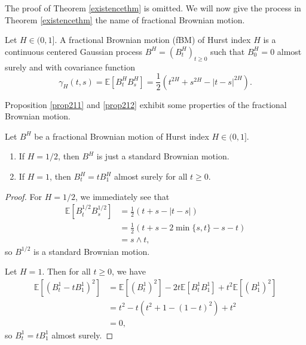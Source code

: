 The proof of Theorem \ref{existencethm} is omitted. 
We will now give the process in Theorem \ref{existencethm} the name of fractional Brownian motion.%
\begin{defn}
    Let $H\in (0,1]$. A fractional Brownian motion (fBM) of Hurst index $H$ is a continuous centered Gaussian process $B^{H}=(B_{t}^{H})_{t\geq 0}$ such that $B_{0}^{H}=0$ almost surely and with covariance function
    \begin{equation}
        \gamma_{H}(t,s)=\mathbb{E}[B_{t}^{H}B_{s}^{H}]=\frac{1}{2}\left(t^{2H}+s^{2H}-|t-s|^{2H}\right).
    \end{equation}
\end{defn}
Proposition \ref{prop211} and \ref{prop212} exhibit some properties of the fractional Brownian motion.
\begin{prop}\label{prop211}
    Let $B^{H}$ be a fractional Brownian motion of Hurst index $H\in (0,1]$.
    \begin{enumerate}
        \item If $H=1/2$, then $B^{H}$ is just a standard Brownian motion.
        \item If $H=1$, then $B^{H}_{t}=tB_{1}^{H}$ almost surely for all $t\geq 0$.
    \end{enumerate}
\end{prop}
\begin{proof}
    For $H=1/2$, we immediately see that
    \begin{align}
        \mathbb{E}[B_{t}^{1/2}B_{s}^{1/2}]&=\frac{1}{2}\left(t+s-|t-s|\right)\\
        &= \frac{1}{2}\left(t+s-2 \min\{s,t\}-s-t\right)\\
        &= s\land t,
    \end{align}
    so $B^{1/2}$ is a standard Brownian motion.

    Let $H=1$. Then for all $t\geq 0$, we have
    \begin{align}
        \mathbb{E}\left[(B^{1}_{t}-tB_{1}^{1})^{2}\right]&= \mathbb{E}\left[(B_{t}^{1})^{2}\right]-2t\mathbb{E}\left[B_{t}^{1}B_{1}^{1}\right]+t^{2}\mathbb{E}\left[(B_{1}^{1})^{2}\right]\\
        &= t^{2}-t\left(t^{2}+1-(1-t)^{2}\right)+t^{2}\\
        &= 0,
    \end{align}
    so $B_{t}^{1}=tB_{1}^{1}$ almost surely.
\end{proof}
